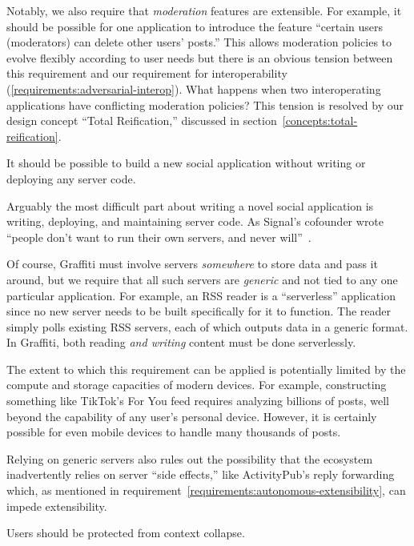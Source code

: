 Notably, we also require that \emph{moderation} features are extensible.
For example, it should be possible for one application to introduce the feature
``certain users (moderators) can delete other users' posts.''
This allows moderation policies to evolve flexibly according to user needs
but there is an obvious tension between this requirement
and our requirement for interoperability (\ref{requirements:adversarial-interop}).
What happens when two interoperating applications have conflicting moderation policies?
This tension is resolved by our design concept ``Total Reification,''
discussed in section~\ref{concepts:total-reification}.

\begin{requirement}[Serverless]
\label{requirements:serverless}
    It should be possible to build a new social application without writing or deploying any server code.
\end{requirement}

Arguably the most difficult part about writing a novel
social application is writing, deploying,
and maintaining server code.
As Signal's cofounder wrote
``people don’t want to run their own servers, and never will''~\cite{moxieweb3}.

Of course, Graffiti must involve servers \emph{somewhere} to store data
and pass it around, but we require that all such servers are \emph{generic}
and not tied to any one particular application.
For example, an RSS reader is a ``serverless'' application since
no new server needs to be built specifically for it to function.
The reader simply polls existing RSS servers, each of which outputs data in a generic format.
In Graffiti, both reading \emph{and writing} content must be done serverlessly.

The extent to which this requirement can be applied is potentially limited
by the compute and storage capacities of modern devices.
For example, constructing something like TikTok's For You feed requires
analyzing billions of posts, well beyond the capability of any user's personal device.
However, it is certainly possible for even mobile devices to handle many thousands of posts.

Relying on generic servers also rules out the possibility that
the ecosystem inadvertently relies on server ``side effects,''
like ActivityPub's reply forwarding which, as mentioned in
requirement~\ref{requirements:autonomous-extensibility}, can impede extensibility.

\begin{requirement}
\label{requirements:context-differentiation}
    Users should be protected from context collapse.
\end{requirement}

